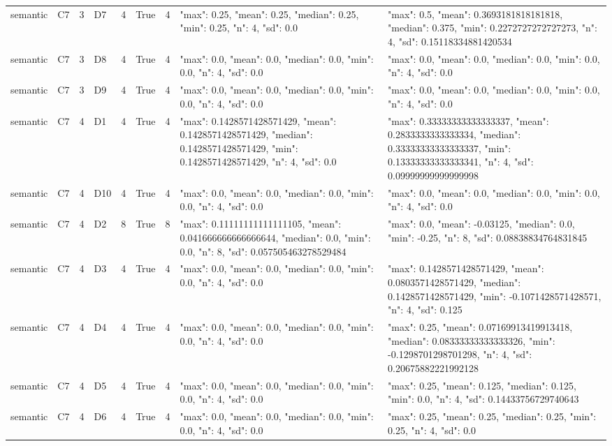 \begin{tabular}{lllllllll}
semantic & C7 & 3 & D7 & 4 & True & 4 & {"max": 0.25, "mean": 0.25, "median": 0.25, "min": 0.25, "n": 4, "sd": 0.0} & {"max": 0.5, "mean": 0.3693181818181818, "median": 0.375, "min": 0.2272727272727273, "n": 4, "sd": 0.15118334881420534} \\
semantic & C7 & 3 & D8 & 4 & True & 4 & {"max": 0.0, "mean": 0.0, "median": 0.0, "min": 0.0, "n": 4, "sd": 0.0} & {"max": 0.0, "mean": 0.0, "median": 0.0, "min": 0.0, "n": 4, "sd": 0.0} \\
semantic & C7 & 3 & D9 & 4 & True & 4 & {"max": 0.0, "mean": 0.0, "median": 0.0, "min": 0.0, "n": 4, "sd": 0.0} & {"max": 0.0, "mean": 0.0, "median": 0.0, "min": 0.0, "n": 4, "sd": 0.0} \\
semantic & C7 & 4 & D1 & 4 & True & 4 & {"max": 0.1428571428571429, "mean": 0.1428571428571429, "median": 0.1428571428571429, "min": 0.1428571428571429, "n": 4, "sd": 0.0} & {"max": 0.33333333333333337, "mean": 0.2833333333333334, "median": 0.33333333333333337, "min": 0.13333333333333341, "n": 4, "sd": 0.09999999999999998} \\
semantic & C7 & 4 & D10 & 4 & True & 4 & {"max": 0.0, "mean": 0.0, "median": 0.0, "min": 0.0, "n": 4, "sd": 0.0} & {"max": 0.0, "mean": 0.0, "median": 0.0, "min": 0.0, "n": 4, "sd": 0.0} \\
semantic & C7 & 4 & D2 & 8 & True & 8 & {"max": 0.11111111111111105, "mean": 0.041666666666666644, "median": 0.0, "min": 0.0, "n": 8, "sd": 0.057505463278529484} & {"max": 0.0, "mean": -0.03125, "median": 0.0, "min": -0.25, "n": 8, "sd": 0.08838834764831845} \\
semantic & C7 & 4 & D3 & 4 & True & 4 & {"max": 0.0, "mean": 0.0, "median": 0.0, "min": 0.0, "n": 4, "sd": 0.0} & {"max": 0.1428571428571429, "mean": 0.0803571428571429, "median": 0.1428571428571429, "min": -0.1071428571428571, "n": 4, "sd": 0.125} \\
semantic & C7 & 4 & D4 & 4 & True & 4 & {"max": 0.0, "mean": 0.0, "median": 0.0, "min": 0.0, "n": 4, "sd": 0.0} & {"max": 0.25, "mean": 0.07169913419913418, "median": 0.08333333333333326, "min": -0.1298701298701298, "n": 4, "sd": 0.20675882221992128} \\
semantic & C7 & 4 & D5 & 4 & True & 4 & {"max": 0.0, "mean": 0.0, "median": 0.0, "min": 0.0, "n": 4, "sd": 0.0} & {"max": 0.25, "mean": 0.125, "median": 0.125, "min": 0.0, "n": 4, "sd": 0.14433756729740643} \\
semantic & C7 & 4 & D6 & 4 & True & 4 & {"max": 0.0, "mean": 0.0, "median": 0.0, "min": 0.0, "n": 4, "sd": 0.0} & {"max": 0.25, "mean": 0.25, "median": 0.25, "min": 0.25, "n": 4, "sd": 0.0} \\

\end{tabular}
